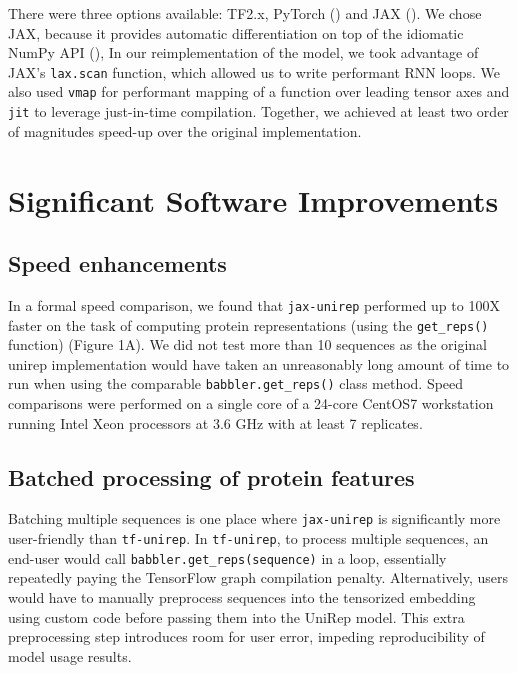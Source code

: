 \documentclass[twoside,11pt]{article}
\begin{document}
There were three options available: TF2.x, PyTorch (\cite{pytorch})
and JAX (\cite{jax2018github}).
We chose JAX, because it provides automatic differentiation
on top of the idiomatic NumPy API (\cite{oliphant2006guide}),
In our reimplementation of the model,
we took advantage of JAX's \verb|lax.scan| function,
which allowed us to write performant RNN loops.
We also used \verb|vmap| for performant mapping of a function
over leading tensor axes
and \verb|jit| to leverage just-in-time compilation.
Together, we achieved at least two order of magnitudes speed-up
over the original implementation.

\section{Significant Software Improvements}

\subsection{Speed enhancements}

In a formal speed comparison, we found that \verb|jax-unirep|
performed up to 100X faster on the task of computing protein representations
(using the \verb|get_reps()| function) (Figure 1A\vphantom{\ref{fig:fig01}}).
We did not test more than 10 sequences
as the original unirep implementation would have taken
an unreasonably long amount of time to run
when using the comparable \verb|babbler.get_reps()| class method.
Speed comparisons were performed on a single core of a 24-core
CentOS7 workstation running Intel Xeon processors at 3.6 GHz
with at least 7 replicates.

\subsection{Batched processing of protein features}

Batching multiple sequences is one place where \verb|jax-unirep|
is significantly more user-friendly than \verb|tf-unirep|.
In \verb|tf-unirep|, to process multiple sequences,
an end-user would call \verb|babbler.get_reps(sequence)| in a loop,
essentially repeatedly paying the TensorFlow graph compilation penalty.
Alternatively, users would have to manually preprocess sequences
into the tensorized embedding using custom code
before passing them into the UniRep model.
This extra preprocessing step introduces room for user error,
impeding reproducibility of model usage results.
\end{document}
